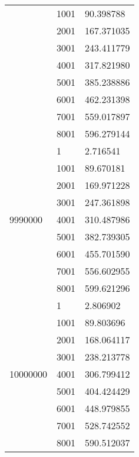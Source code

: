 \begin{table}[htb!]
\begin{tabular}{lll}
 & 1001 & 90.398788 \\
 & 2001 & 167.371035 \\
 & 3001 & 243.411779 \\
 & 4001 & 317.821980 \\
 & 5001 & 385.238886 \\
 & 6001 & 462.231398 \\
 & 7001 & 559.017897 \\
 & 8001 & 596.279144 \\
\multirow[c]{9}{*}{9990000} & 1 & 2.716541 \\
 & 1001 & 89.670181 \\
 & 2001 & 169.971228 \\
 & 3001 & 247.361898 \\
 & 4001 & 310.487986 \\
 & 5001 & 382.739305 \\
 & 6001 & 455.701590 \\
 & 7001 & 556.602955 \\
 & 8001 & 599.621296 \\
\multirow[c]{9}{*}{10000000} & 1 & 2.806902 \\
 & 1001 & 89.803696 \\
 & 2001 & 168.064117 \\
 & 3001 & 238.213778 \\
 & 4001 & 306.799412 \\
 & 5001 & 404.424429 \\
 & 6001 & 448.979855 \\
 & 7001 & 528.742552 \\
 & 8001 & 590.512037 \\
\bottomrule
\end{tabular}
\end{table}

